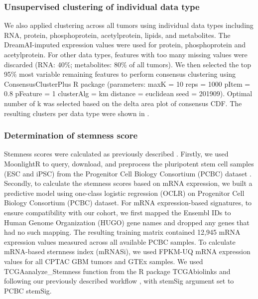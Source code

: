 \subsubsection{Unsupervised clustering of individual data type}
We also applied clustering across all tumors using individual data types including RNA, protein, phosphoprotein, acetylprotein, lipids, and metabolites. The DreamAI-imputed expression values were used for protein, phosphoprotein and acetylprotein. For other data types, features with too many missing values were discarded (RNA: 40\%; metabolites: 80\% of all tumors). We then selected the top 95\% most variable remaining features to perform consensus clustering using ConsensusClusterPlus R package (parameters: maxK = 10 reps = 1000 pItem = 0.8 pFeature = 1 clusterAlg = \textquotedbl{}km\textquotedbl{} distance = \textquotedbl{}euclidean\textquotedbl{} seed = 201909). Optimal number of k was selected based on the delta area plot of consensus CDF. The resulting clusters per data type were shown in .

\subsubsection{Determination of stemness score}
Stemness scores were calculated as previously described \cite{maltatm_wiznerowiczm:MachineLearning2018}. Firstly, we used MoonlightR \cite{colapricoa_papaleoe:InterpretingPathways2020} to query, download, and preprocess the pluripotent stem cell samples (ESC and iPSC) from the Progenitor Cell Biology Consortium (PCBC) dataset \cite{dailyk_ombergl:MolecularPhenotypic2017,salomonisn_lutzkoc:IntegratedGenomic2016}. Secondly, to calculate the stemness scores based on mRNA expression, we built a predictive model using one-class logistic regression (OCLR) \cite{sokolova_stuartjm:OneClassDetection2016} on Progenitor Cell Biology Consortium (PCBC) dataset. For mRNA expression-based signatures, to ensure compatibility with our cohort, we first mapped the Ensembl IDs to Human Genome Organization (HUGO) gene names and dropped any genes that had no such mapping. The resulting training matrix contained 12,945 mRNA expression values measured across all available PCBC samples. To calculate mRNA-based sternness index (mRNASi), we used FPKM-UQ mRNA expression values for all CPTAC GBM tumors and GTEx samples. We used TCGAanalyze\_Stemness function from the R package TCGAbiolinks \cite{colapricoa_noushmehrh:TCGAbiolinksBioconductor2016} and following our previously described workflow \cite{silvatc_noushmehrh:TCGAWorkflow2016}, with \textquotedbl{}stemSig\textquotedbl{} argument set to PCBC stemSig.

